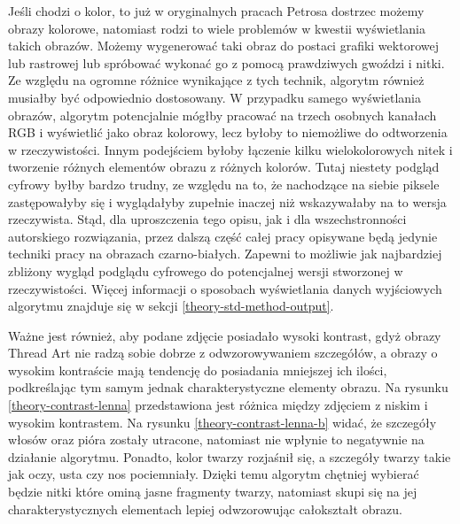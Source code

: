         Jeśli chodzi o kolor, to już w oryginalnych pracach Petrosa dostrzec możemy obrazy kolorowe, natomiast rodzi to wiele problemów w kwestii wyświetlania takich obrazów. Możemy wygenerować taki obraz do postaci grafiki wektorowej lub rastrowej lub spróbować wykonać go z pomocą prawdziwych gwoździ i nitki. Ze względu na ogromne różnice wynikające z tych technik, algorytm również musiałby być odpowiednio dostosowany. W przypadku samego wyświetlania obrazów, algorytm potencjalnie mógłby pracować na trzech osobnych kanałach RGB i wyświetlić jako obraz kolorowy, lecz byłoby to niemożliwe do odtworzenia w rzeczywistości. Innym podejściem byłoby łączenie kilku wielokolorowych nitek i tworzenie różnych elementów obrazu z różnych kolorów. Tutaj niestety podgląd cyfrowy byłby bardzo trudny, ze względu na to, że nachodzące na siebie piksele zastępowałyby się i wyglądałyby zupełnie inaczej niż wskazywałaby na to wersja rzeczywista. Stąd, dla uproszczenia tego opisu, jak i dla wszechstronności autorskiego rozwiązania, przez dalszą część całej pracy opisywane będą jedynie techniki pracy na obrazach czarno-białych. Zapewni to możliwie jak najbardziej zbliżony wygląd podglądu cyfrowego do potencjalnej wersji stworzonej w rzeczywistości. Więcej informacji o sposobach wyświetlania danych wyjściowych algorytmu znajduje się w sekcji \ref{theory-std-method-output}.
        
        Ważne jest również, aby podane zdjęcie posiadało wysoki kontrast, gdyż obrazy Thread Art nie radzą sobie dobrze z odwzorowywaniem szczegółów, a obrazy o wysokim kontraście mają tendencję do posiadania mniejszej ich ilości, podkreślając tym samym jednak charakterystyczne elementy obrazu. Na rysunku \ref{theory-contrast-lenna} przedstawiona jest różnica między zdjęciem z niskim i wysokim kontrastem. Na rysunku \ref{theory-contrast-lenna-b} widać, że szczegóły włosów oraz pióra zostały utracone, natomiast nie wpłynie to negatywnie na działanie algorytmu. Ponadto, kolor twarzy rozjaśnił się, a szczegóły twarzy takie jak oczy, usta czy nos pociemniały. Dzięki temu algorytm chętniej wybierać będzie nitki które ominą jasne fragmenty twarzy, natomiast skupi się na jej charakterystycznych elementach lepiej odwzorowując całokształt obrazu.
        
